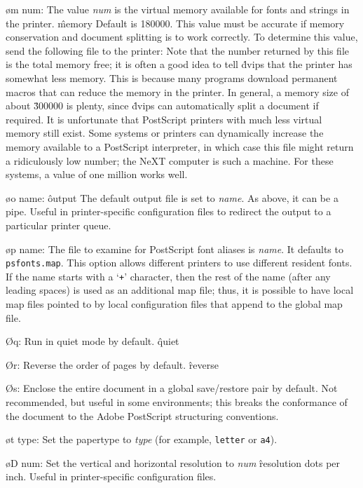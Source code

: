 {\o m num:  The value {\it num} is the virtual memory available for fonts
and strings in the printer.
\^{memory}
Default is 180000.  This value must be accurate if memory conservation and
document splitting is to work correctly.  To determine this value, send the
following file to the printer:
{\parindent=40pt}
\noindent
Note that the number returned by this file is the total memory free;
it is often a good idea to tell \.{dvips} that the printer has somewhat
less memory.  This is because many programs download permanent macros
that can reduce the memory in the printer.  In general, a memory size
of about \.{300000} is plenty, since \.{dvips} can automatically split
a document if required.  It is unfortunate that PostScript printers with
much less virtual memory still exist.
Some systems or printers can dynamically increase the memory available
to a PostScript interpreter, in which case this file might return a
ridiculously low number; the NeXT computer is such a machine.  For these
systems, a value of one million works well.

\o o name:
\^{output}
The default output file is set to {\it name}.  As above, it can be a pipe.
Useful in printer-specific configuration files to redirect the output to
a particular printer queue.

\o p name:
The file to examine for PostScript font aliases is {\it name}.	It
defaults to {\tt psfonts.map}.	This option allows different printers
to use different resident fonts.  If the name starts with a `{\tt +}'
character, then the rest of the name (after any leading spaces) is used
as an additional map file; thus, it is possible to have local map files
pointed to by local configuration files that append to the global
map file.

\O q:  Run in quiet mode by default.
\^{quiet}

\O r:  Reverse the order of pages by default.
\^{reverse}

\O s:
Enclose the entire document in a global save/restore pair by default.
Not recommended, but useful in some environments; this breaks the
conformance of the document to the Adobe PostScript structuring
conventions.

\o t type:
Set the papertype to {\it type} (for example, {\tt letter} or
{\tt a4}).

\o D num:
Set the vertical and horizontal resolution to {\it num}
\^{resolution}
dots per inch.	Useful in printer-specific configuration files.

}
